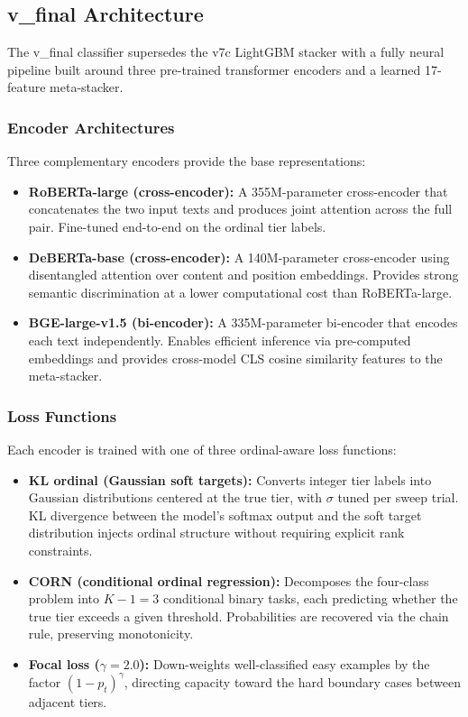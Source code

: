 \subsection{v\_final Architecture}

The v\_final classifier supersedes the v7c LightGBM stacker with a
fully neural pipeline built around three pre-trained transformer
encoders and a learned 17-feature meta-stacker.

\subsubsection{Encoder Architectures}

Three complementary encoders provide the base representations:
\begin{itemize}
    \item \textbf{RoBERTa-large (cross-encoder):} A 355M-parameter
          cross-encoder that concatenates the two input texts and
          produces joint attention across the full pair. Fine-tuned
          end-to-end on the ordinal tier labels.
    \item \textbf{DeBERTa-base (cross-encoder):} A 140M-parameter
          cross-encoder using disentangled attention over content and
          position embeddings. Provides strong semantic discrimination
          at a lower computational cost than RoBERTa-large.
    \item \textbf{BGE-large-v1.5 (bi-encoder):} A 335M-parameter
          bi-encoder that encodes each text independently. Enables
          efficient inference via pre-computed embeddings and provides
          cross-model CLS cosine similarity features to the meta-stacker.
\end{itemize}

\subsubsection{Loss Functions}

Each encoder is trained with one of three ordinal-aware loss functions:
\begin{itemize}
    \item \textbf{KL ordinal (Gaussian soft targets):} Converts integer
          tier labels into Gaussian distributions centered at the true
          tier, with $\sigma$ tuned per sweep trial. KL divergence
          between the model's softmax output and the soft target
          distribution injects ordinal structure without requiring
          explicit rank constraints.
    \item \textbf{CORN (conditional ordinal regression):} Decomposes the
          four-class problem into $K{-}1 = 3$ conditional binary tasks,
          each predicting whether the true tier exceeds a given threshold.
          Probabilities are recovered via the chain rule, preserving
          monotonicity.
    \item \textbf{Focal loss ($\gamma{=}2.0$):} Down-weights well-classified
          easy examples by the factor $(1-p_t)^\gamma$, directing capacity
          toward the hard boundary cases between adjacent tiers.
\end{itemize}

